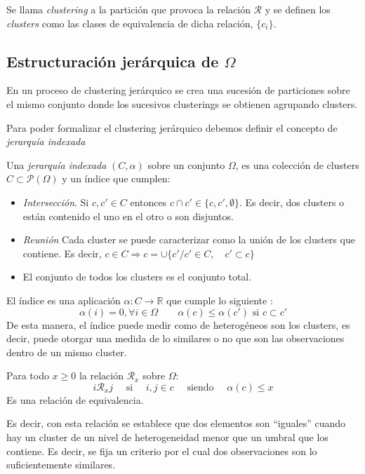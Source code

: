 \begin{defi}
Se llama \textit{clustering} a la partición que provoca la relación $\mathcal{R}$ y se definen los \textit{clusters} como las clases de equivalencia de dicha relación, $\lbrace c_i\rbrace$. 
\end{defi}
\newpage
\subsection{Estructuración jerárquica de $\Omega$}\label{Estructuración jerárquica}

\noindent En un proceso de clustering jerárquico se crea una sucesión de particiones sobre el mismo conjunto donde los sucesivos clusterings se obtienen agrupando clusters.  

\noindent Para poder formalizar el clustering jerárquico debemos definir el concepto de \textit{jerarquía indexada}

\begin{defi}
Una \textit{jerarquía indexada} $(C,\alpha)$ sobre un conjunto $\Omega$, es una colección de clusters $C\subset \mathcal{P}(\Omega)$ y un índice que cumplen:
\begin{itemize}
\item \textit{Intersección}. Si $c,c'\in C$ entonces $c\cap c'\in\lbrace c, c', \emptyset\rbrace$. Es decir, dos clusters o están contenido el uno en el otro o son disjuntos. 
\item \textit{Reunión} Cada cluster se puede caracterizar como la unión de los clusters que contiene. Es decir, $c\in C \Rightarrow c=\cup \lbrace c'/c'\in C, \quad c'\subset c\rbrace$
\item El conjunto de todos los clusters es el conjunto total.
\end{itemize}

\noindent El índice es una aplicación $\alpha:C \rightarrow \mathbb{R}$ que cumple lo siguiente :
\begin{equation}
\alpha(i)=0, \forall i\in\Omega \quad\quad \alpha(c)\leq \alpha(c') \text{ si } c\subset c'
\end{equation}
De esta manera, el índice puede medir como de heterogéneos son los clusters, es decir, puede otorgar una medida de lo similares o no que son las observaciones dentro de un mismo cluster. 
\end{defi}

\begin{propo}
Para todo $x\geq 0 $ la relación $\mathcal{R}_x$ sobre $\Omega$:
\begin{equation}
i\mathcal{R}_x j \quad \text{ si } \quad i,j\in c \quad \text{ siendo }\quad\alpha(c)\leq x
\end{equation}
Es una relación de equivalencia.
\end{propo}
\noindent Es decir, con esta relación se establece que dos elementos son ``iguales'' cuando hay un cluster de un nivel de heterogeneidad menor que un umbral que los contiene. Es decir, se fija un criterio por el cual dos observaciones son lo suficientemente similares.

